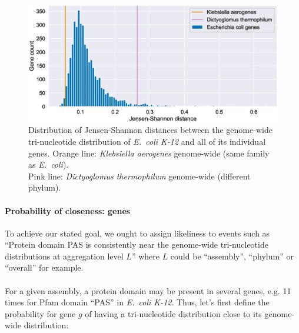 \documentclass[12pt]{article}
\begin{document}
\pagebreak

\begin{figure}[!htb]
\includegraphics[scale = .55]{e_coli_distances.eps}
\caption{Distribution of Jensen-Shannon distances between the genome-wide tri-nucleotide distribution of \textit{E.~coli K-12} and all of its individual genes. Orange line: \textit{Klebsiella aerogenes} genome-wide (same family as \textit{E.~coli}).\\Pink line: \textit{Dictyoglomus thermophilum} genome-wide (different phylum).}
\label{fig:e_coli_distances}
\end{figure}

\paragraph{Probability of closeness: genes}
To achieve our stated goal, we ought to assign likeliness to events such as ``Protein domain PAS is consistently near the genome-wide tri-nucleotide distributions at aggregation level $L$'' where $L$ could be ``assembly'', ``phylum'' or ``overall'' for example.\\
\\
For a given assembly, a protein domain may be present in several genes, e.g. 11 times for Pfam domain ``PAS'' in \textit{E.~coli K-12}. Thus, let's first define the probability for gene $g$ of having a tri-nucleotide distribution close to its genome-wide distribution:
\end{document}
